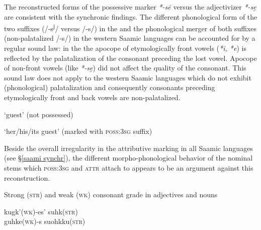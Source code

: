{The reconstructed  forms of the possessive marker \textit{*-sē} \cite[73]{sammallahti1998b} versus the adjectivizer \textit{*-se̮} are consistent with the synchronic findings. The different phonological form of the two suffixes (/-s\textsuperscript{j}/ versus /-s/) in the  and the phonological merger of both suffixes (non-palatalized /-s/) in the western Saamic languages can be accounted for by a regular sound law: in the  the apocope of etymologically front vowels (\textit{*i, *e}) is reflected by the palatalization of the consonant preceding the lost vowel. Apocope of non-front vowels (like \textit{*-se̮}) did not affect the quality of the consonant. This sound law does not apply to the western Saamic languages which do not exhibit (phonological) palatalization and consequently consonants preceding etymologically front and back vowels are non-palatalized.
\begin{exe}
\settowidth{}
\ex
\begin{xlist}
\ex \rm{‘guest’ (not possessed)}
\begin{xlist}
\end{xlist}
\ex \rm{‘her/his/its guest’ (marked with \textsc{poss:3sg} suffix)}
\begin{xlist}
\end{xlist}
\end{xlist}
\end{exe}
Beside the overall irregularity in the attributive marking in all Saamic languages (see \S\ref{saami synchr}), the different morpho-phonological behavior of the nominal stems which \textsc{poss:3sg} and \textsc{attr} attach to appears to be an argument against this reconstruction. 
\begin{exe}
\settowidth{}
\ex \rm{Strong (\textsc{str}) and weak (\textsc{wk}) consonant grade in adjectives and nouns}
\begin{xlist}
\ex 
\glll 	kugk'(\textsc{wk})-es' suhk(\textsc{str}) 		\\
	guhke(\textsc{wk})-s suohkku(\textsc{str}) 		\\

\end{xlist}
\end{exe}}
